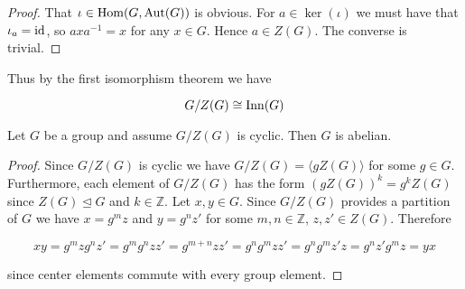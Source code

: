 \begin{proof}
	That $\iota \in \operatorname{Hom}(G,\operatorname{Aut}(G))$ is obvious. For $a \in \ker(\iota)$ we must have that $\iota_a = \operatorname{id}$, so $axa^{-1} = x$ for any $x \in G$. Hence $a \in Z(G)$. The converse is trivial.
\end{proof}

Thus by the first isomorphism theorem we have 

\begin{equation*}
	G/Z(G) \cong \operatorname{Inn}(G)
\end{equation*}

\begin{proposition}
	Let $G$ be a group and assume $G/Z(G)$ is cyclic. Then $G$ is abelian.
\end{proposition}

\begin{proof}
	Since $G/Z(G)$ is cyclic we have $G/Z(G) = \langle g Z(G) \rangle$ for some $g \in G$. Furthermore, each element of $G/Z(G)$ has the form $(gZ(G))^k = g^kZ(G)$ since $Z(G) \unlhd G$ and $k \in \mathbb{Z}$. Let $x,y \in G$. Since $G/Z(G)$ provides a partition of $G$ we have $x = g^m z$ and $y = g^nz'$ for some $m,n \in \mathbb{Z}$, $z,z' \in Z(G)$. Therefore 

	\begin{equation*}
		xy = g^mz g^n z' = g^m g^n zz' = g^{m + n}zz' = g^n g^m z z' = g^n g^m z'z = g^n z' g^m z = yx
	\end{equation*}

	\noindent since center elements commute with every group element.
\end{proof}
